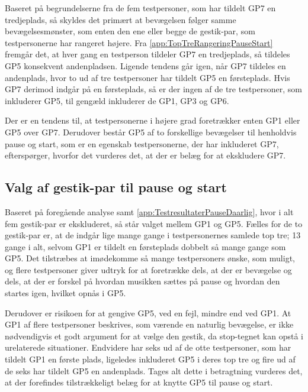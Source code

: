 \noindent
%
Baseret på begrundelserne fra de fem testpersoner, som har tildelt GP7 en tredjeplads, så skyldes det primært at bevægelsen følger samme bevægelsesmønster, som enten den ene eller begge de gestik-par, som testpersonerne har rangeret højere. Fra \autoref{app:TopTreRangeringPauseStart} fremgår det, at hver gang en testperson tildeler GP7 en tredjeplads, så tildeles GP5 konsekvent andenpladsen. Ligende tendens går igen, når GP7 tildeles en andenplads, hvor to ud af tre testpersoner har tildelt GP5 en førsteplads. Hvis GP7 derimod indgår på en førsteplads, så er der ingen af de tre testpersoner, som inkluderer GP5, til gengæld inkluderer de GP1, GP3 og GP6.

Der er en tendens til, at testpersonerne i højere grad foretrækker enten GP1 eller GP5 over GP7. Derudover består GP5 af to forskellige bevægelser til henholdvis pause og start, som er en egenskab testpersonerne, der har inkluderet GP7, efterspørger, hvorfor det vurderes det, at der er belæg for at ekskludere GP7. 
%
\subsection{Valg af gestik-par til pause og start}
\label{TestresultaterValgAfGestikkerValgPauseStart}
%
Baseret på foregående analyse samt \autoref{app:TestresultaterPauseDaarlig}, hvor i alt fem gestik-par er ekskluderet, så står valget mellem GP1 og GP5. Fælles for de to gestik-par er, at de indgår lige mange gange i testpersonernes samlede top tre; 13 gange i alt, selvom GP1 er tildelt en førsteplads dobbelt så mange gange som GP5. Det tilstræbes at imødekomme så mange testpersoners ønske, som muligt, og flere testpersoner giver udtryk for at foretrække dels, at der er bevægelse og dels, at der er forskel på hvordan musikken sættes på pause og hvordan den startes igen, hvilket opnås i GP5.

Derudover er risikoen for at gengive GP5, ved en fejl, mindre end ved GP1. At GP1 af flere testpersoner beskrives, som værende en naturlig bevægelse, er ikke nødvendigvis et godt argument for at vælge den gestik, da stop-tegnet kan opstå i urelaterede situationer. Endvidere har seks ud af de otte testpersoner, som har tildelt GP1 en første plads, ligeledes inkluderet GP5 i deres top tre og fire ud af de seks har tildelt GP5 en andenplads. Tages alt dette i betragtning vurderes det, at der forefindes tilstrækkeligt belæg for at knytte GP5 til pause og start.

